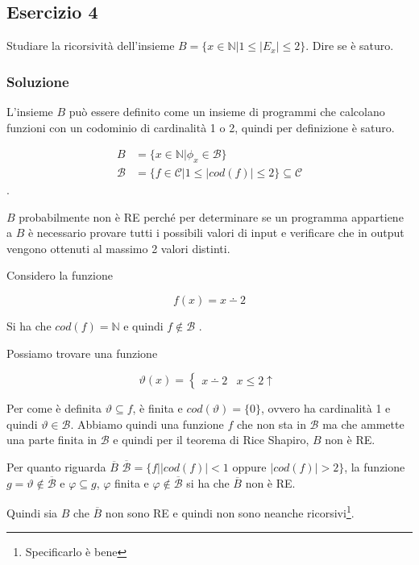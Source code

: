 \subsection{Esercizio 4}

Studiare la ricorsività dell'insieme $ B = \{ x \in \mathbb{N} | 1 \leq | E_x| \leq 2 \}$. Dire se è saturo.

\subsubsection{Soluzione}

L'insieme $B$ può essere definito come un insieme di programmi che calcolano funzioni con un codominio di cardinalità 1 o 2, quindi per definizione è saturo.

\begin{align*}
	B &= \{ x \in \mathbb{N} | \phi_x \in \mathcal{B} \} \\
	\mathcal{B} &= \{ f \in \mathcal{C} | 1 \leq |cod(f) | \leq 2 \} \subseteq \mathcal{C}
\end{align*}.

$B$ probabilmente non è RE perché per determinare se un programma appartiene a $B$ è necessario provare tutti i possibili valori di input e verificare che in output vengono ottenuti al massimo 2 valori distinti.

Considero la funzione 

$$
f(x) = x \dotminus 2
$$

Si ha che $cod(f) = \mathbb{N}$ e quindi $f \notin \mathcal{B}$ .

Possiamo trovare una funzione

$$
\vartheta(x) = \begin{cases}
	x \dotminus 2 &x \leq 2
	\uparrow
\end{cases}
$$

Per come è definita $\vartheta \subseteq f$, è finita e $cod(\vartheta) = \{0\}$, ovvero ha cardinalità 1 e quindi $\vartheta \in \mathcal{B}$. Abbiamo quindi una funzione $f$ che non sta in $\mathcal{B}$ ma che ammette una parte finita in $\mathcal{B}$ e quindi per il teorema di Rice Shapiro, $B$ non è RE.

Per quanto riguarda $\overline{B}$ $\overline{\mathcal{B}} = \{ f | |cod(f)| < 1 \text{ oppure } |cod(f)| > 2 \}$, la funzione $g = \vartheta \notin \overline{\mathcal{B}}$ e $\varphi \subseteq g$, $\varphi$ finita e $\varphi \notin \overline{\mathcal{B}}$ si ha che $\overline{B}$ non è RE.

Quindi sia $B$ che $\overline{B}$ non sono RE e quindi non sono neanche ricorsivi\footnote{Specificarlo è bene}.


